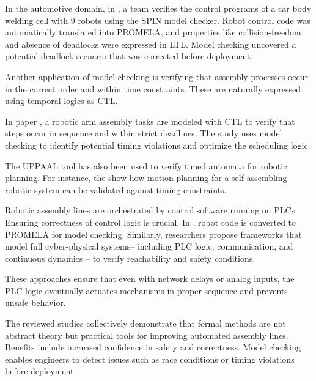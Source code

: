 In the automotive domain, in \cite{Weissmann2011}, 
a team verifies the control programs of a car body welding cell with 
9 robots using the SPIN model checker. Robot control code was automatically translated 
into PROMELA, and properties like collision-freedom and absence of 
deadlocks were expressed in LTL. Model checking uncovered a potential deadlock 
scenario that was corrected before deployment.


Another application of model checking is verifying that assembly processes 
occur in the correct order and within time constraints. These are naturally 
expressed using temporal logics  as CTL.

In paper \cite{Halder2017}, a robotic arm assembly tasks are modeled with 
CTL to verify that steps occur in sequence and within strict deadlines. 
The study uses model checking to identify potential timing violations and 
optimize the scheduling logic.

The UPPAAL tool has also been used to verify timed automata for robotic 
planning. For instance, the \cite{Wang2014} show how motion planning for 
a self-assembling robotic system can be validated against timing constraints.

Robotic assembly lines are orchestrated by control software running on 
PLCs. Ensuring correctness of control logic is crucial. In \cite{
Weissmann2011}, robot code is converted to PROMELA for model checking. 
Similarly, researchers propose frameworks that model full cyber-physical 
systems-- including PLC logic, communication, and continuous dynamics --
to verify reachability and safety conditions.

These approaches ensure that even with network delays or analog inputs,
the PLC logic eventually actuates mechanisms in proper sequence and 
prevents unsafe behavior.

The reviewed studies collectively demonstrate that formal methods are 
not abstract theory but practical tools for improving automated assembly 
lines. Benefits include increased confidence in safety and correctness. 
Model checking enables engineers to detect issues such as race conditions or 
timing violations before deployment.

